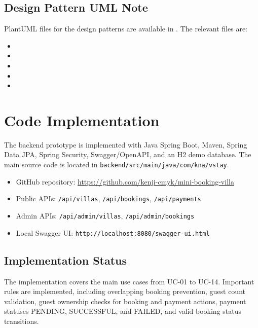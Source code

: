 \documentclass[12pt,a4paper]{article}
\begin{document}
\subsection{Design Pattern UML Note}

PlantUML files for the design patterns are available in . The relevant files are:

\begin{itemize}[noitemsep]
  \item {}
  \item {}
  \item {}
  \item {}
  \item {}
\end{itemize}

\section{Code Implementation}

The backend prototype is implemented with Java Spring Boot, Maven, Spring Data JPA, Spring Security, Swagger/OpenAPI, and an H2 demo database. The main source code is located in \texttt{backend/src/main/java/com/kna/vstay}.

\begin{itemize}[noitemsep]
  \item GitHub repository: \href{https://github.com/kenji-cmyk/mini-booking-villa}{https://github.com/kenji-cmyk/mini-booking-villa}
  \item Public APIs: \texttt{/api/villas}, \texttt{/api/bookings}, \texttt{/api/payments}
  \item Admin APIs: \texttt{/api/admin/villas}, \texttt{/api/admin/bookings}
  \item Local Swagger UI: \texttt{http://localhost:8080/swagger-ui.html}
\end{itemize}

\subsection{Implementation Status}

The implementation covers the main use cases from UC-01 to UC-14. Important rules are implemented, including overlapping booking prevention, guest count validation, guest ownership checks for booking and payment actions, payment statuses PENDING, SUCCESSFUL, and FAILED, and valid booking status transitions.
\end{document}
